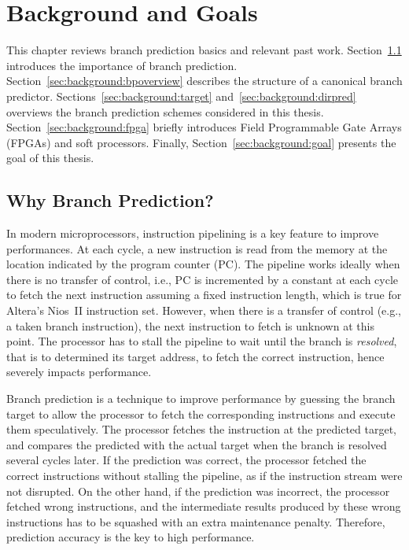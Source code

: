 \chapter{Background and Goals}
\label{chap:background}
This chapter reviews branch prediction basics and relevant past work. Section~\ref{sec:background:whybp} introduces the importance of branch prediction. Section~\ref{sec:background:bpoverview} describes the structure of a canonical branch predictor. Sections~\ref{sec:background:target} and~\ref{sec:background:dirpred} overviews the branch prediction schemes considered in this thesis. Section~\ref{sec:background:fpga} briefly introduces Field Programmable Gate Arrays (FPGAs) and soft processors. Finally, Section~\ref{sec:background:goal} presents the goal of this thesis. 

\section{Why Branch Prediction?}
\label{sec:background:whybp}
In modern microprocessors, instruction pipelining is a key feature to improve performances. At each cycle, a new instruction is read from the memory at the location indicated by the program counter (PC). The pipeline works ideally when there is no transfer of control, i.e., PC is incremented by a constant at each cycle to fetch the next instruction assuming a fixed instruction length, which is true for Altera's Nios~II instruction set. However, when there is a transfer of control (e.g., a taken branch instruction), the next instruction to fetch is unknown at this point. The processor has to stall the pipeline to wait until the branch is \textit{resolved}, that is to determined its target address, to fetch the correct instruction, hence severely impacts performance.

Branch prediction is a technique to improve performance by guessing the branch target  to allow the processor to fetch the corresponding instructions and execute them speculatively. The processor fetches the instruction at the predicted target, and compares the predicted with the actual target when the branch is resolved several cycles later. If the prediction was correct, the processor fetched the correct instructions without stalling the pipeline, as if the instruction stream were not disrupted. On the other hand, if the prediction was incorrect, the processor fetched wrong instructions, and the intermediate results produced by these wrong instructions has to be squashed with an extra maintenance penalty. Therefore, prediction accuracy is the key to high performance.

